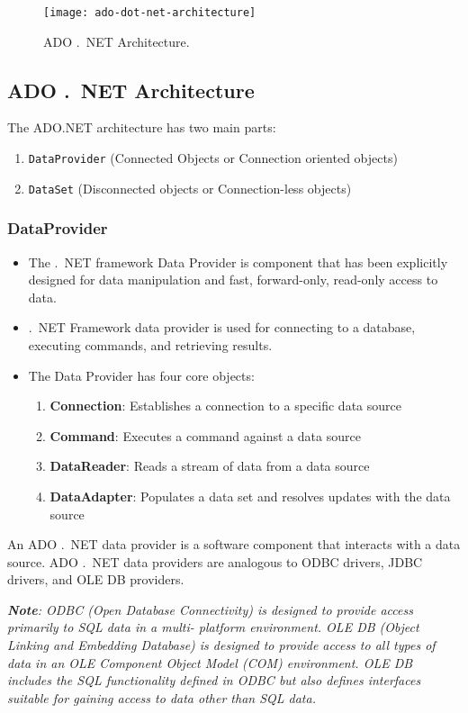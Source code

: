 \begin{figure}[ht]
	\centering
	\texttt{[image: ado-dot-net-architecture]}
	\caption{ADO .\ NET Architecture.}\label{fig:ado-dot-net-objects}
\end{figure}

\subsection{ADO .\ NET Architecture}
The ADO.NET architecture has two main parts:
\begin{enumerate}
	\item \texttt{DataProvider} (Connected Objects or Connection oriented objects)
	\item \texttt{DataSet} (Disconnected objects or Connection-less objects)
\end{enumerate}


\subsubsection{DataProvider}
\begin{itemize}
	\item The .\ NET framework Data Provider is component that has been explicitly designed for data manipulation
	and fast, forward-only, read-only access to data.
	\item .\ NET Framework data provider is used for connecting to a database, executing commands, and retrieving
	results.
	\item The Data Provider has four core objects:
	\begin{enumerate}
		\item \textbf{Connection}: Establishes a connection to a specific data source
		\item \textbf{Command}: Executes a command against a data source
		\item \textbf{DataReader}: Reads a stream of data from a data source
		\item \textbf{DataAdapter}: Populates a data set and resolves updates with the data source
	\end{enumerate}
\end{itemize}
An ADO .\ NET data provider is a software component that interacts with a data source. ADO .\ NET
data providers are analogous to ODBC drivers, JDBC drivers, and OLE DB providers.

\noindent \emph{\textbf{Note}: ODBC (Open Database Connectivity) is designed to provide access primarily to SQL data in a multi-
platform environment. OLE DB (Object Linking and Embedding Database) is designed to provide access to all
types of data in an OLE Component Object Model (COM) environment. OLE DB includes the SQL functionality
defined in ODBC but also defines interfaces suitable for gaining access to data other than SQL data.}


